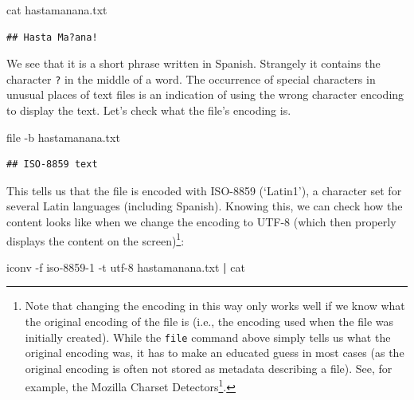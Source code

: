 \documentclass[
  12pt,
]{style/krantz}
\newenvironment{Shaded}{\begin{snugshade}}{\end{snugshade}}
\newcommand{\AttributeTok}[1]{\textcolor[rgb]{0.77,0.63,0.00}{#1}}
\newcommand{\FunctionTok}[1]{\textcolor[rgb]{0.00,0.00,0.00}{#1}}
\newcommand{\KeywordTok}[1]{\textcolor[rgb]{0.13,0.29,0.53}{\textbf{#1}}}
\newcommand{\NormalTok}[1]{#1}
\renewcommand{\href}[2]{#2\footnote{\url{#1}}}
\begin{document}
\begin{Shaded}
\begin{Highlighting}[]
\FunctionTok{cat}\NormalTok{ hastamanana.txt}
\end{Highlighting}
\end{Shaded}

\begin{verbatim}
## Hasta Ma?ana!
\end{verbatim}

We see that it is a short phrase written in Spanish. Strangely it contains the character \texttt{?} in the middle of a word. The occurrence of special characters in unusual places of text files is an indication of using the wrong character encoding to display the text. Let's check what the file's encoding is.

\begin{Shaded}
\begin{Highlighting}[]
\FunctionTok{file} \AttributeTok{{-}b}\NormalTok{ hastamanana.txt}
\end{Highlighting}
\end{Shaded}

\begin{verbatim}
## ISO-8859 text
\end{verbatim}

This tells us that the file is encoded with ISO-8859 (`Latin1'), a character set for several Latin languages (including Spanish). Knowing this, we can check how the content looks like when we change the encoding to UTF-8 (which then properly displays the content on the screen)\footnote{Note that changing the encoding in this way only works well if we know what the original encoding of the file is (i.e., the encoding used when the file was initially created). While the \texttt{file} command above simply tells us what the original encoding was, it has to make an educated guess in most cases (as the original encoding is often not stored as metadata describing a file). See, for example, the \href{https://www-archive.mozilla.org/projects/intl/chardet.html}{Mozilla Charset Detectors}.}:

\begin{Shaded}
\begin{Highlighting}[]
\FunctionTok{iconv} \AttributeTok{{-}f}\NormalTok{ iso{-}8859{-}1 }\AttributeTok{{-}t}\NormalTok{ utf{-}8 hastamanana.txt }\KeywordTok{|} \FunctionTok{cat}
\end{Highlighting}
\end{Shaded}
\end{document}
